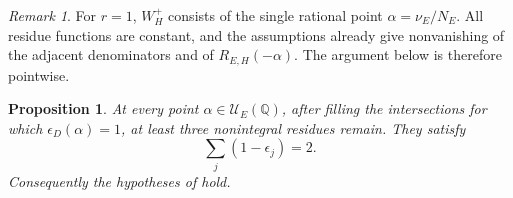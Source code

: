 \documentclass[12pt]{amsart}
\numberwithin{equation}{section}
\theoremstyle{plain}
\newtheorem{proposition}[theorem]{Proposition}
\theoremstyle{definition}
\theoremstyle{remark}
\newtheorem{remark}[theorem]{Remark}
\theoremstyle{definition}
\newcommand{\Q}{\mathbb Q}
\begin{document}
\begin{remark}
For $r=1$, $W_H^+$ consists of the single rational point $\alpha=\nu_E/N_E$. All residue functions are constant, and the assumptions already give nonvanishing of the adjacent denominators and of $R_{E,H}(-\alpha)$. The argument below is therefore pointwise.
\end{remark}


\begin{proposition}\label{prop:selected-numerical-exhaustion}
At every point $\alpha\in\mathcal U_E(\Q)$, after filling the intersections for which $\epsilon_D(\alpha)=1$, at least three nonintegral residues remain. They satisfy
\begin{equation*}
\sum_j(1-\epsilon_j)=2.
\end{equation*}
Consequently the hypotheses of  hold.
\end{proposition}
\end{document}
